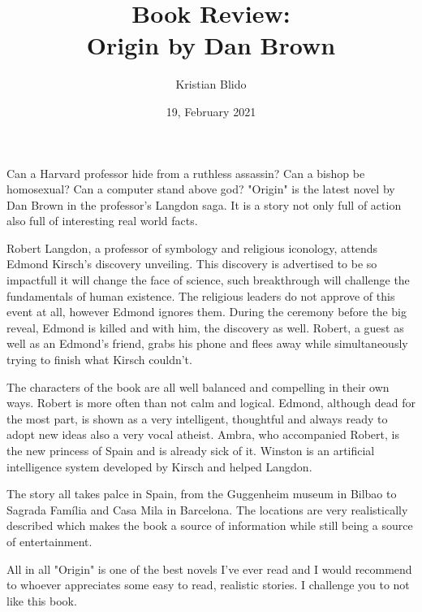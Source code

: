 \documentclass[12pt, a4paper]{article}
\title{Book Review: \\ Origin by Dan Brown}
\author{Kristian Blido}
\date{19, February 2021}
\begin{document}
	\maketitle
Can a Harvard professor hide from a ruthless assassin? Can a bishop be homosexual? Can a computer stand above god? "Origin" is the latest novel by Dan Brown in the professor's Langdon saga. It is a story not only full of action also full of interesting real world facts.

Robert Langdon, a professor of symbology and religious iconology, attends Edmond Kirsch's discovery unveiling. This discovery is advertised to be so impactfull it will change the face of science, such breakthrough will challenge the fundamentals of human existence. The religious leaders do not approve of this event at all, however Edmond ignores them. During the ceremony before the big reveal, Edmond is killed and with him, the discovery as well. Robert, a guest as well as an Edmond's friend, grabs his phone and flees away while simultaneously trying to finish what Kirsch couldn't. 

The characters of the book are all well balanced and compelling in their own ways. Robert is more often than not calm and logical. Edmond, although dead for the most part, is shown as a very intelligent, thoughtful and always ready to adopt new ideas also a very vocal atheist. Ambra, who accompanied Robert, is the new princess of Spain and is already sick of it. Winston is an artificial intelligence system developed by Kirsch and helped Langdon.

The story all takes palce in Spain, from the Guggenheim museum in Bilbao to Sagrada Família and Casa Mila in Barcelona. The locations are very realistically described which makes the book a source of information while still being a source of entertainment. 

All in all "Origin" is one of the best novels I've ever read and I would recommend to whoever appreciates some easy to read, realistic stories. I challenge you to not like this book. 
\end{document}
